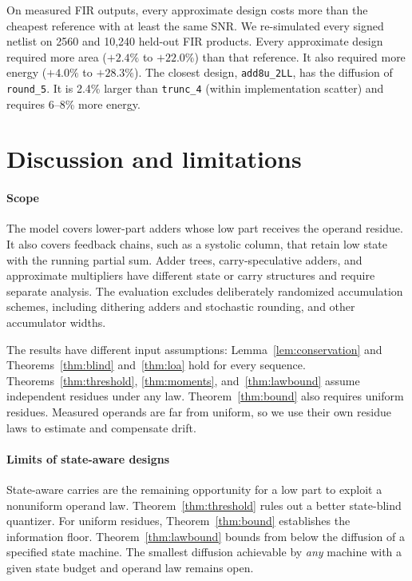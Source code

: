 \documentclass[preprint,12pt,numbers]{elsarticle}
\theoremstyle{definition}
\begin{document}
On measured FIR outputs, every approximate design costs more than the
cheapest reference with at least the same SNR. We re-simulated every
signed netlist on 2560 and 10{,}240 held-out FIR products.
Every approximate design required more area ($+2.4\%$ to $+22.0\%$)
than that reference. It also required more energy ($+4.0\%$ to
$+28.3\%$). The closest design, \texttt{add8u\_2LL}, has the
diffusion of \texttt{round\_5}. It is 2.4\% larger than
\texttt{trunc\_4} (within implementation scatter) and requires 6--8\% more
energy.

\section{Discussion and limitations}
\label{sec:discussion}

\paragraph{Scope}
The model covers lower-part adders whose low part receives the operand
residue. It also covers feedback chains, such as a systolic column,
that retain low state with the running partial sum.
Adder trees, carry-speculative adders, and approximate multipliers
have different state or carry structures and require separate analysis.
The evaluation excludes deliberately randomized accumulation schemes,
including dithering adders and stochastic rounding, and other
accumulator widths.

The results have different input assumptions: Lemma~\ref{lem:conservation} and
Theorems~\ref{thm:blind} and~\ref{thm:loa} hold for every sequence.
Theorems~\ref{thm:threshold}, \ref{thm:moments}, and~\ref{thm:lawbound}
assume independent residues under any law. Theorem~\ref{thm:bound}
also requires uniform residues. Measured operands are far from
uniform, so we use their own residue laws to estimate and compensate
drift.

\paragraph{Limits of state-aware designs}
State-aware carries are the remaining opportunity for a low part to
exploit a nonuniform operand law.
Theorem~\ref{thm:threshold} rules out a better state-blind quantizer.
For uniform residues, Theorem~\ref{thm:bound} establishes the
information floor. Theorem~\ref{thm:lawbound} bounds from below the diffusion of a
specified state machine. The smallest diffusion achievable by \emph{any} machine
with a given state budget and operand law remains open.
\end{document}
